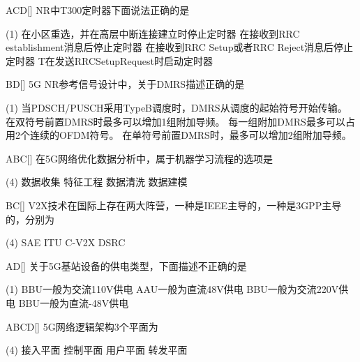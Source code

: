 \begin{choice}{\;ACD\;}[]
    NR中T300定时器下面说法正确的是
    \begin{tasks}(1)
        \task 在小区重选，并在高层中断连接建立时停止定时器
        \task 在接收到RRC establishment消息后停止定时器
        \task 在接收到RRC Setup或者RRC Reject消息后停止定时器
        \task T在发送RRCSetupRequest时启动定时器
    \end{tasks}
\end{choice}

\begin{choice}{\;BD\;}[]
    5G NR参考信号设计中，关于DMRS描述正确的是
    \begin{tasks}(1)
        \task 当PDSCH/PUSCH采用TypeB调度时，DMRS从调度的起始符号开始传输。
        \task 在双符号前置DMRS时最多可以增加1组附加导频。
        \task 每一组附加DMRS最多可以占用2个连续的OFDM符号。
        \task 在单符号前置DMRS时，最多可以增加2组附加导频。
    \end{tasks}
\end{choice}


\begin{choice}{\;ABC\;}[]
    在5G网络优化数据分析中，属于机器学习流程的选项是
    \begin{tasks}(4)
        \task 数据收集
        \task 特征工程
        \task 数据清洗
        \task 数据建模
    \end{tasks}
\end{choice}


\begin{choice}{\;BC\;}[]
    V2X技术在国际上存在两大阵营，一种是IEEE主导的，一种是3GPP主导的，分别为
    \begin{tasks}(4)
        \task SAE
        \task ITU
        \task C-V2X
        \task DSRC
    \end{tasks}
\end{choice}


\begin{choice}{\;AD\;}[]
    关于5G基站设备的供电类型，下面描述不正确的是
    \begin{tasks}(1)
        \task BBU一般为交流110V供电
        \task AAU一般为直流48V供电
        \task BBU一般为交流220V供电
        \task BBU一般为直流-48V供电
    \end{tasks}
\end{choice}


\begin{choice}{\;ABCD\;}[]
    5G网络逻辑架构3个平面为
    \begin{tasks}(4)
        \task 接入平面
        \task 控制平面
        \task 用户平面
        \task 转发平面
    \end{tasks}
\end{choice}

